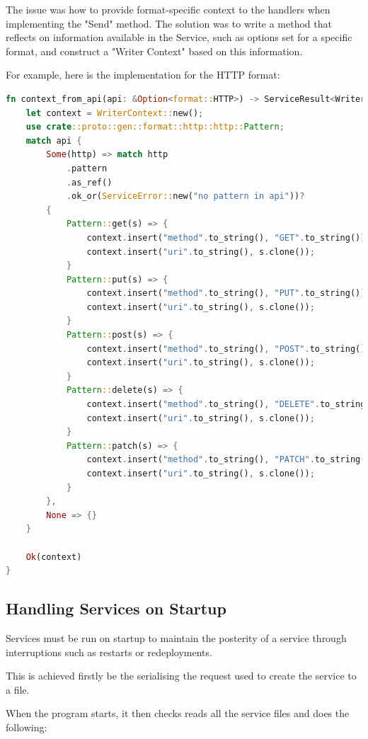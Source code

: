\documentclass[a4paper,12pt]{report}
\begin{document}
The issue was how to provide format-specific context to the handlers when implementing the "Send" method. The solution was to write a method that reflects on information available in the Service, such as options set for a specific format, and construct a "Writer Context" based on this information.

For example, here is the implementation for the HTTP format:

\begin{lstlisting}[language=Rust]
fn context_from_api(api: &Option<format::HTTP>) -> ServiceResult<WriterContext> {
    let context = WriterContext::new();
    use crate::proto::gen::format::http::http::Pattern;
    match api {
        Some(http) => match http
            .pattern
            .as_ref()
            .ok_or(ServiceError::new("no pattern in api"))?
        {
            Pattern::get(s) => {
                context.insert("method".to_string(), "GET".to_string());
                context.insert("uri".to_string(), s.clone());
            }
            Pattern::put(s) => {
                context.insert("method".to_string(), "PUT".to_string());
                context.insert("uri".to_string(), s.clone());
            }
            Pattern::post(s) => {
                context.insert("method".to_string(), "POST".to_string());
                context.insert("uri".to_string(), s.clone());
            }
            Pattern::delete(s) => {
                context.insert("method".to_string(), "DELETE".to_string());
                context.insert("uri".to_string(), s.clone());
            }
            Pattern::patch(s) => {
                context.insert("method".to_string(), "PATCH".to_string());
                context.insert("uri".to_string(), s.clone());
            }
        },
        None => {}
    }

    Ok(context)
}
\end{lstlisting}

\subsection{Handling Services on Startup}

Services must be run on startup to maintain the posterity of a service through interruptions such as restarts or redeployments.

This is achieved firstly be the  serialising the request used to create the service to a file.

When the program starts, it then checks reads all the service files and does the following:
\end{document}
